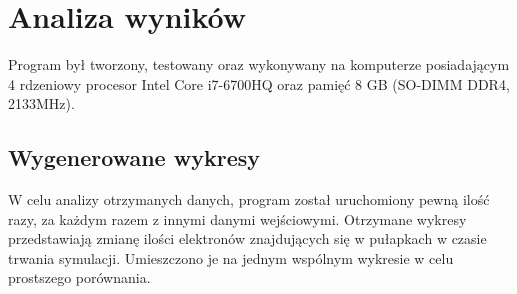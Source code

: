 \chapter{Analiza wyników}
Program był tworzony, testowany oraz wykonywany na komputerze posiadającym 4 rdzeniowy procesor Intel Core i7-6700HQ oraz pamięć 8 GB (SO-DIMM DDR4, 2133MHz).

\section{Wygenerowane wykresy}
\label{wynik:wykres}
W celu analizy otrzymanych danych, program został uruchomiony pewną ilość razy, za każdym razem z innymi danymi wejściowymi. Otrzymane wykresy przedstawiają zmianę ilości elektronów znajdujących się w pułapkach w czasie trwania symulacji. Umieszczono je na jednym wspólnym wykresie w celu prostszego porównania.

